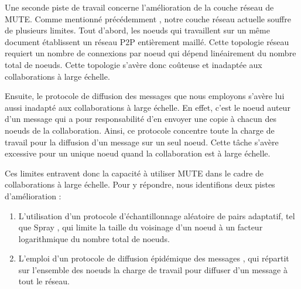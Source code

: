 Une seconde piste de travail concerne l'amélioration de la couche réseau de \ac{MUTE}.
Comme mentionné précédemment , notre couche réseau actuelle souffre de plusieurs limites.
Tout d'abord, les noeuds qui travaillent sur un même document établissent un réseau \ac{P2P} entièrement maillé.
Cette topologie réseau requiert un nombre de connexions par noeud qui dépend linéairement du nombre total de noeuds.
Cette topologie s'avère donc coûteuse et inadaptée aux collaborations à large échelle.

Ensuite, le protocole de diffusion des messages que nous employons s'avère lui aussi inadapté aux collaborations à large échelle.
En effet, c'est le noeud auteur d'un message qui a pour responsabilité d'en envoyer une copie à chacun des noeuds de la collaboration.
Ainsi, ce protocole concentre toute la charge de travail pour la diffusion d'un message sur un seul noeud.
Cette tâche s'avère excessive pour un unique noeud quand la collaboration est à large échelle.

Ces limites entravent donc la capacité à utiliser \ac{MUTE} dans le cadre de collaborations à large échelle.
Pour y répondre, nous identifions deux pistes d'amélioration :
\begin{enumerate}
    \item L'utilisation d'un protocole d'échantillonnage aléatoire de pairs adaptatif, tel que Spray \cite{2018-spray-nedelec}, qui limite la taille du voisinage d'un noeud à un facteur logarithmique du nombre total de noeuds.
    \item L'emploi d'un protocole de diffusion épidémique des messages \cite{1999-epidemic-dissemination-birman}, qui répartit sur l'ensemble des noeuds la charge de travail pour diffuser d'un message à tout le réseau.
\end{enumerate}
